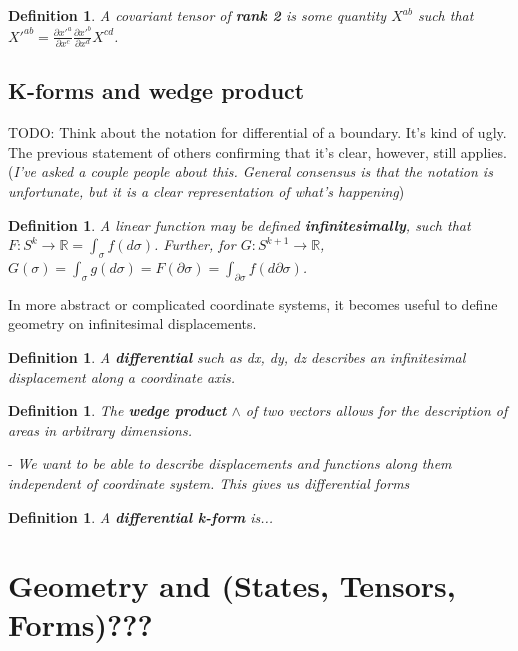 \documentclass{book}
\newtheorem{defn}[equation]{Definition}
\begin{document}
\begin{defn}
	A covariant tensor of \textbf{rank 2} is some quantity $X^{ab}$ such that $X'^{ab} = \frac{\partial x'^a}{\partial x^c} \frac{\partial x'^b}{\partial x^d} X^{cd}$. 
\end{defn}

\section{K-forms and wedge product}

TODO: Think about the notation for differential of a boundary. It's kind of ugly. The previous statement of others confirming that it's clear, however, still applies.  (\emph{I've asked a couple people about this. General consensus is that the notation is unfortunate, but it is a clear representation of what's happening})

\begin{defn}
	A linear function may be defined \textbf{infinitesimally}, such that $F : S^k \to \mathbb{R} = \int_{\sigma} f(d\sigma)$. Further, for $G : S^{k+1} \to \mathbb{R}$, $G(\sigma) = \int_{\sigma} g(d\sigma) = F(\partial\sigma) = \int_{\partial\sigma}f(d\partial\sigma)$. 
\end{defn}

In more abstract or complicated coordinate systems, it becomes useful to define geometry on infinitesimal displacements. 

\begin{defn}
	A \textbf{differential} such as dx, dy, dz describes an infinitesimal displacement along a coordinate axis. 
\end{defn}

\begin{defn}
	The \textbf{wedge product} $\wedge$ of two vectors allows for the description of areas in arbitrary dimensions. 
\end{defn}

- \emph{We want to be able to describe displacements and functions along them independent of coordinate system. This gives us differential forms}


\begin{defn}
	A \textbf{differential k-form} is...
\end{defn}


\chapter{Geometry and (States, Tensors, Forms)???}
\end{document}
